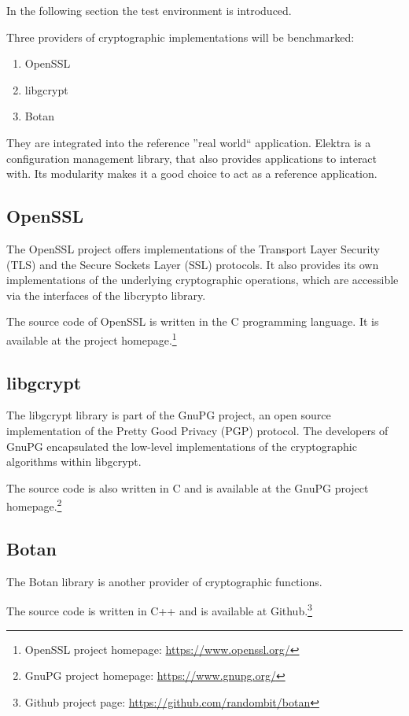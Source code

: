In the following section the test environment is introduced.

Three providers of cryptographic implementations will be benchmarked:

\begin{enumerate}
\item OpenSSL
\item libgcrypt
\item Botan
\end{enumerate}

They are integrated into the reference ''real world`` application.
Elektra is a configuration management library, that also provides applications to interact with.
Its modularity makes it a good choice to act as a reference application.

	\subsection{OpenSSL}

The OpenSSL project offers implementations of the Transport Layer Security (TLS) and the Secure Sockets Layer (SSL) protocols.
It also provides its own implementations of the underlying cryptographic operations, which are accessible via the interfaces of the libcrypto library.

The source code of OpenSSL is written in the C programming language.
It is available at the project homepage.\footnote{OpenSSL project homepage: \url{https://www.openssl.org/}}

	\subsection{libgcrypt}

The libgcrypt library is part of the GnuPG project, an open source implementation of the Pretty Good Privacy (PGP) protocol.
The developers of GnuPG encapsulated the low-level implementations of the cryptographic algorithms within libgcrypt.

The source code is also written in C and is available at the GnuPG project homepage.\footnote{GnuPG project homepage: \url{https://www.gnupg.org/}}

	\subsection{Botan}

The Botan library is another provider of cryptographic functions.

The source code is written in C++ and is available at Github.\footnote{Github project page: \url{https://github.com/randombit/botan}}


